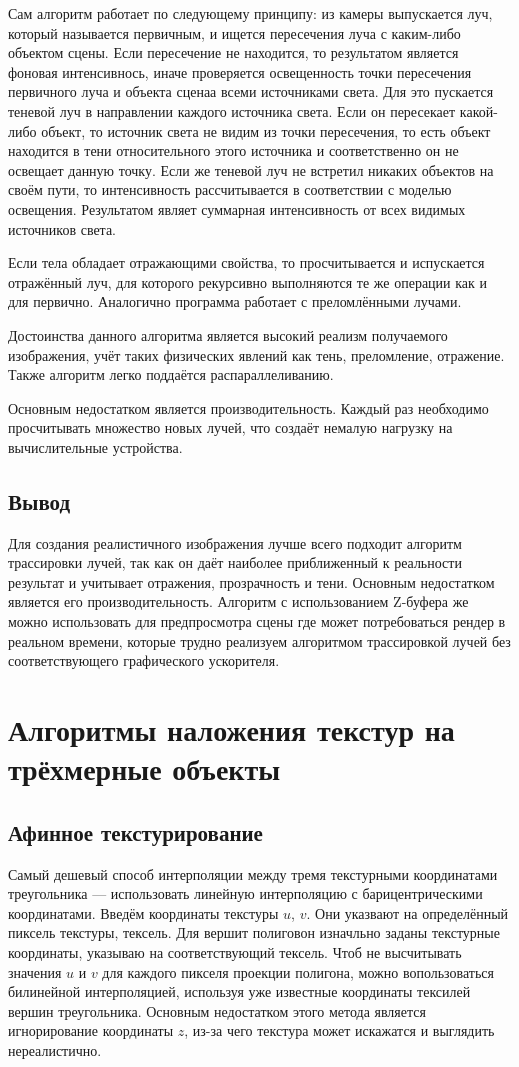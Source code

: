\documentclass[12pt,a4paper,oneside]{report}
\begin{document}
				\quad Сам алгоритм работает по следующему принципу: из камеры выпускается луч, который называется первичным, и ищется пересечения луча с каким-либо объектом сцены. Если пересечение не находится, то результатом является фоновая интенсивнось, иначе проверяется освещенность точки пересечения первичного луча и объекта сценаа всеми источниками света. Для это пускается теневой луч в направлении каждого источника света. Если он пересекает какой-либо объект, то источник света не видим из точки пересечения, то есть объект находится в тени относительного этого источника и соответственно он не освещает данную точку. Если же теневой луч не встретил никаких объектов на своём пути, то интенсивность рассчитывается в соответствии с моделью освещения. Результатом являет суммарная интенсивность от всех видимых источников света.
				
				\quad Если тела обладает отражающими свойства, то просчитывается и испускается отражённый луч, для которого рекурсивно выполняются те же операции как и для первично. Аналогично программа работает с преломлёнными лучами.
				
				\quad Достоинства данного алгоритма является высокий реализм получаемого изображения, учёт таких физических явлений как тень, преломление, отражение. Также алгоритм легко поддаётся распараллеливанию.
				
				\quad Основным недостатком является производительность. Каждый раз необходимо просчитывать множество новых лучей, что создаёт немалую нагрузку на вычислительные устройства.
			\subsection{Вывод}
				\quad Для создания реалистичного изображения лучше всего подходит алгоритм трассировки лучей, так как он даёт наиболее приближенный к реальности результат и учитывает отражения, прозрачность и тени. Основным недостатком является его производительность. Алгоритм с использованием Z-буфера же можно использовать для предпросмотра сцены где может потребоваться рендер в реальном времени, которые трудно реализуем алгоритмом трассировкой лучей без соответствующего графического ускорителя.
		\section{Алгоритмы наложения текстур на трёхмерные объекты}
			\subsection{Афинное текстурирование}
				\quad Самый дешевый способ интерполяции между тремя текстурными координатами треугольника — использовать линейную интерполяцию с барицентрическими координатами. Введём координаты текстуры $u$, $v$. Они указвают на определённый пиксель текстуры, тексель. Для вершит полиговон изначльно заданы текстурные координаты, указываю на соответствующий тексель. Чтоб не высчитывать значения $u$ и $v$ для каждого пикселя проекции полигона, можно вопользоваться билинейной интерполяцией, используя уже известные координаты тексилей вершин треугольника. Основным недостатком этого метода является игнорирование координаты $z$, из-за чего текстура может искажатся и выглядить нереалистично.
\end{document}
